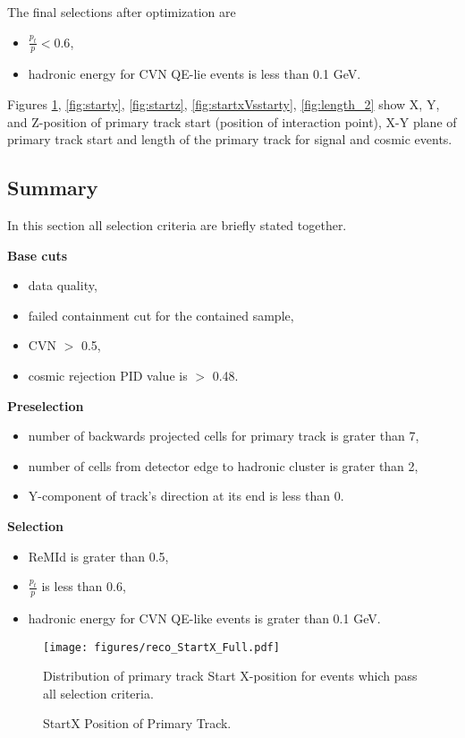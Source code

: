 The final selections after optimization are
\begin{itemize}
\item $\frac{p_t}{p} < 0.6$,
\item hadronic energy for CVN QE-lie events is less than 0.1 GeV.
\end{itemize}
Figures \ref{fig:startx}, \ref{fig:starty}, \ref{fig:startz}, \ref{fig:startxVsstarty}, \ref{fig:length_2} show
X, Y, and Z-position of primary track start (position of interaction point), X-Y plane of primary track start and
length of the primary track for signal and cosmic events. 

\subsection{Summary}
In this section all selection criteria are briefly stated together. 

\textbf{Base cuts}
\begin{itemize}
\item data quality,
\item failed containment cut for the contained sample,
\item CVN $>$ 0.5,
\item cosmic rejection PID value is $>$ 0.48.
\end{itemize}

\textbf{Preselection}
\begin{itemize}
\item number of backwards projected cells for primary track is grater than 7,
\item number of cells from detector edge to hadronic cluster is grater than 2,
\item Y-component of track's direction at its end is less than 0.
\end{itemize}

\textbf{Selection}
\begin{itemize}
\item ReMId is grater than 0.5,
\item $\frac{p_t}{p}$ is less than 0.6,
\item hadronic energy for CVN QE-like events is grater than 0.1 GeV.
\end{itemize}

\begin{figure}
\centering
\texttt{[image: figures/reco\_StartX\_Full.pdf]}
\caption{StartX Position of Primary Track.}
{Distribution of primary track Start X-position for events which pass all selection criteria.  }
\label{fig:startx}
\end{figure}

